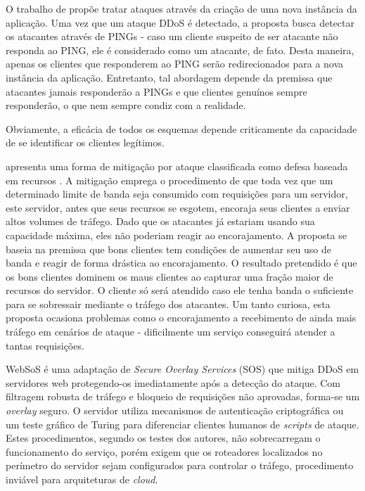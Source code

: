O trabalho de \cite{Bakshi:10} propõe tratar ataques através da criação de uma nova instância da aplicação. Uma vez que um ataque DDoS é detectado, a proposta busca detectar os atacantes através de PINGs - caso um cliente suspeito de ser atacante não responda ao PING, ele é considerado como um atacante, de fato. Desta maneira, apenas os clientes que responderem ao PING serão 
redirecionados para a nova instância da aplicação. Entretanto, tal abordagem depende da premissa que atacantes jamais responderão a PINGs e que clientes genuínos sempre responderão, o que nem sempre condiz com a realidade.

Obviamente, a eficácia de todos os esquemas depende criticamente da capacidade de se identificar os clientes legítimos. 



\cite{Walfish:2010:DDO:1731060.1731063} apresenta uma forma de mitigação por ataque classificada como defesa baseada em recursos \cite{Dwork:1992:PVP:646757.705669}. A mitigação emprega o procedimento de que toda vez que um determinado limite de banda seja consumido com requisições para um servidor, este servidor, antes que seus recursos se esgotem, encoraja seus clientes a enviar altos volumes de tráfego. Dado que os atacantes já estariam usando sua capacidade máxima, eles não poderiam reagir ao encorajamento. A proposta se baseia na premissa que bons clientes tem condições de aumentar seu uso de banda e reagir de forma drástica ao encorajamento. O resultado pretendido é que os bons clientes dominem os maus clientes ao capturar uma fração maior de recursos do servidor. O cliente só será atendido caso ele tenha banda o suficiente para se sobressair mediante o tráfego dos atacantes. Um tanto curiosa, esta proposta ocasiona problemas como %
o encorajamento a recebimento de ainda mais tráfego em cenários de ataque - 
dificilmente um serviço conseguirá atender a tantas requisições. 



WebSoS \cite{Stavrou:2005:WOS:1090583.1648614} é uma adaptação de \emph{Secure Overlay Services} (SOS) \cite{Keromytis:2002:SSO:964725.633032} que mitiga DDoS em servidores web protegendo-os imediatamente após a detecção do ataque. Com filtragem robusta de tráfego e bloqueio de requisições não aprovadas, forma-se um \emph{overlay} seguro. O servidor utiliza mecanismos de autenticação criptográfica ou um teste gráfico de Turing \cite{Dietrich00analyzingdistributed} para diferenciar clientes humanos de \emph{scripts} de ataque. Estes procedimentos, segundo os testes dos autores, não sobrecarregam o funcionamento do serviço, porém exigem que os roteadores localizados no perímetro do servidor sejam configurados para controlar o tráfego, procedimento inviável para arquiteturas de \emph{cloud}.
